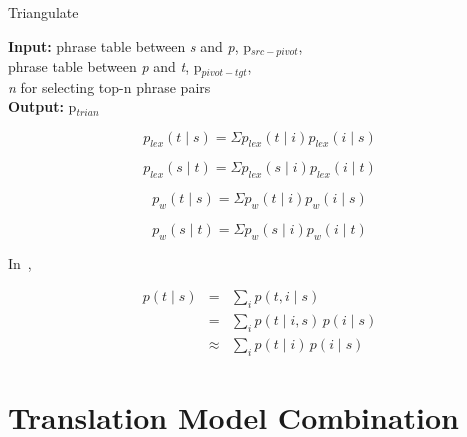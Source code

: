 \begin{algorithm}
\caption{Triangulate}
\textbf{Input:} phrase table between \emph{s} and \emph{p}, p$_{src-pivot}$, \\
 phrase table between \emph{p} and \emph{t}, p$_{pivot-tgt}$,  \\
 \emph{n} for selecting top-n phrase pairs \\
\textbf{Output:} p$_{trian}$
\begin{algorithmic}
 

        \ENDFOR
        \ENDIF
        \ENDFOR


\end{algorithmic}

\end{algorithm}

\begin{equation}
 p_{lex}(t \mid s) = \Sigma p_{lex}(t \mid i) p_{lex}(i \mid s)
\end{equation}

\begin{equation}
	p_{lex}(s \mid t) = \Sigma p_{lex}(s \mid i) p_{lex}(i \mid t)
\end{equation}

\begin{equation}
	p_w(t \mid s) = \Sigma p_w(t \mid i) p_w(i \mid s)
\end{equation}

\begin{equation}
	p_w(s \mid t) = \Sigma p_w(s \mid i) p_w(i \mid t)
\end{equation}

In~\cite{Cohn:07}, 

\begin{eqnarray*}
p(t \mid s)&=&\sum_{i}{p(t, i \mid s)}\\
&=& \sum_{i}{p(t \mid i, s)\,p(i \mid s)}\\
&\approx& \sum_{i}{p(t \mid i)\,p(i \mid s)}
\end{eqnarray*}

\section{Translation Model Combination}
\label{sec:interpolation}

